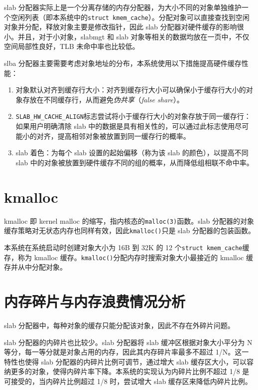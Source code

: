 \documentclass[AutoFakeBold]{LZUThesis}
\begin{document}
\begin{sloppypar}
slab
分配器实际上是一个分离存储的内存分配器，为大小不同的对象单独维护一个空闲列表（即本系统中的\texttt{struct\ kmem\_cache}）。分配对象可以直接查找到空闲对象并分配，释放对象主要是修改指针，因此
slab 分配器对硬件缓存的影响很小。并且，对于小对象，slabmgt 和 slab
对象等相关的数据均放在一页中，不仅空间局部性良好，TLB 未命中率也比较低。

slba
分配器主要需要考虑对象地址的分布，本系统使用以下措施提高硬件缓存性能：

\begin{enumerate}
\def\labelenumi{\arabic{enumi}.}
\item
  对象默认对齐到缓存行大小：对齐到缓存行大小可以确保小于缓存行大小的对象存放在不同缓存行，从而避免\emph{伪共享}（\emph{false
  share}）。
\item
  \texttt{SLAB\_HW\_CACHE\_ALIGN}标志尝试将小于缓存行大小的对象存放于同一缓存行：如果用户明确清除
  slab
  中的数据是具有相关性的，可以通过此标志使用尽可能小的对齐，提高相邻对象被放置到同一缓存行的概率。
\item
  slab 着色：为每个 slab 设置的起始偏移（称为该 slab
  的颜色），以提高不同 slab
  中的对象被放置到硬件缓存不同的组的概率，从而降低组相联不命中率。
\end{enumerate}


\section{kmalloc}

kmalloc 即 kernel malloc 的缩写，指内核态的\texttt{malloc(3)}函数。slab
分配器的对象缓存策略对无状态内存也同样有效，因此\texttt{kmalloc()}只是
slab 分配器的包装函数。

本系统在系统启动时创建对象大小为 16B 到 32K 的 12
个\texttt{struct\ kmem\_cache}缓存，称为 kmalloc
缓存。\texttt{kmalloc()}分配内存时搜索对象大小最接近的 kmalloc
缓存并从中分配对象。


\section{内存碎片与内存浪费情况分析}

slab 分配器中，每种对象的缓存只能分配该对象，因此不存在外碎片问题。

slab 分配器的内碎片也比较少。slab 分配器将 slab 缓冲区根据对象大小平分为
N 等分，每一等分就是对象占用的内存，因此其内存碎片率最多不超过
1/N。这一特性也使得 slab 分配器的内碎片比例可调节，通过增大 slab
缓存区大小，可以容纳更多的对象，使得内碎片率下降。本系统的实现认为内碎片比例不超过
1/8 是可接受的，当内碎片比例超过 1/8 时，尝试增大 slab
缓存区来降低内碎片比例。


\end{sloppypar}
\end{document}

